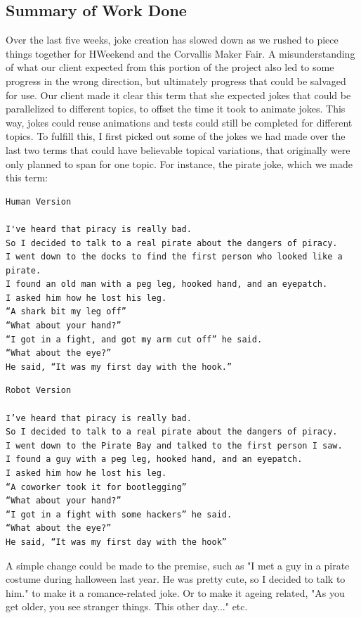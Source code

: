 \documentclass[onecolumn, draftclsnofoot,10pt, compsoc]{IEEEtran}
\begin{document}
\subsection{Summary of Work Done}
Over the last five weeks, joke creation has slowed down as we rushed to piece things together for HWeekend and the Corvallis Maker Fair. A misunderstanding of what our client expected from this portion of the project also led to some progress in the wrong direction, but ultimately progress that could be salvaged for use.
Our client made it clear this term that she expected jokes that could be parallelized to different topics, to offset the time it took to animate jokes. This way, jokes could reuse animations and tests could still be completed for different topics.
To fulfill this, I first picked out some of the jokes we had made over the last two terms that could have believable topical variations, that originally were only planned to span for one topic. For instance, the pirate joke, which we made this term:

\begin{lstlisting}
Human Version

I've heard that piracy is really bad.
So I decided to talk to a real pirate about the dangers of piracy.
I went down to the docks to find the first person who looked like a pirate.
I found an old man with a peg leg, hooked hand, and an eyepatch.
I asked him how he lost his leg.
“A shark bit my leg off”
“What about your hand?”
“I got in a fight, and got my arm cut off” he said.
“What about the eye?”
He said, “It was my first day with the hook.”
\end{lstlisting}

\begin{lstlisting}
Robot Version

I’ve heard that piracy is really bad.
So I decided to talk to a real pirate about the dangers of piracy.
I went down to the Pirate Bay and talked to the first person I saw.
I found a guy with a peg leg, hooked hand, and an eyepatch.
I asked him how he lost his leg.
“A coworker took it for bootlegging”
“What about your hand?”
“I got in a fight with some hackers” he said.
“What about the eye?”
He said, “It was my first day with the hook”
\end{lstlisting}

A simple change could be made to the premise, such as "I met a guy in a pirate costume during halloween last year. He was pretty cute, so I decided to talk to him." to make it a romance-related joke. Or to make it ageing related, "As you get older, you see stranger things. This other day..." etc.
\end{document}

